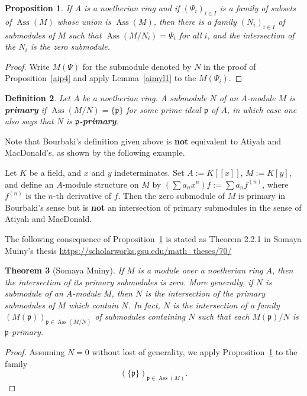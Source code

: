 \documentclass[12pt,letterpaper]{article}%
\newcommand{\oo}{\operatorname}\newcommand{\ooo}{\operatorname*}
\newcommand{\mf}{\mathfrak}
\newcommand{\ppp}{\mf p}
\newcommand{\Ass}{\oo{Ass}}
\newtheorem{thm}{Theorem}%
\newtheorem{df}[thm]{Definition}
\newtheorem{prop}[thm]{Proposition}
\begin{document}
\begin{prop}\label{aimyl2}
If $A$ is a noetherian ring and if $(\Psi_i)_{i\in I}$ is a family of subsets of $\Ass(M)$ whose union is $\Ass(M)$, then there is a family $(N_i)_{i\in I}$ of submodules of $M$ such that $\Ass(M/N_i)=\Psi_i$ for all $i$, and the intersection of the $N_i$ is the zero submodule.
\end{prop}
\begin{proof}
Write $M(\Psi)$ for the submodule denoted by $N$ in the proof of Proposition~\ref{aip4} and apply Lemma~\ref{aimyl1} to the $M(\Psi_i)$.
\end{proof}

\begin{df}
Let $A$ be a noetherian ring. A submodule $N$ of an $A$-module $M$ is \textbf{primary} if $\Ass(M/N)=\{\ppp\}$ for some prime ideal $\ppp$ of $A$, in which case one also says that $N$ is $\ppp$\textbf{-primary}. 
\end{df}

Note that Bourbaki's definition given above is \textbf{not} equivalent to Atiyah and MacDonald's, as shown by the following example.

Let $K$ be a field, and $x$ and $y$ indeterminates. Set $A:=K[[x]]$, $M:=K[y]$, and define an $A$-module structure on $M$ by $(\sum a_nx^n)f:=\sum a_nf^{(n)}$, where $f^{(n)}$ is the $n$-th derivative of $f$. Then the zero submodule of $M$ is primary in Bourbaki's sense but is \textbf{not} an intersection of primary submodules in the sense of Atiyah and MacDonald.

The following consequence of Proposition~\ref{aimyl2} is stated as Theorem 2.2.1 in Somaya Muiny's thesis \href{https://scholarworks.gsu.edu/math_theses/70/}{https://scholarworks.gsu.edu/math\_theses/70/}

\begin{thm}[Somaya Muiny]\label{somaya}
If $M$ is a module over a noetherian ring $A$, then the intersection of its primary submodules is zero. More generally, if $N$ is submodule of an $A$-module $M$, then $N$ is the intersection of the primary submodules of $M$ which contain $N$. In fact, $N$ is the intersection of a family $(M(\ppp))_{\ppp\in\Ass(M/N)}$ of submodules containing $N$ such that each $M(\ppp)/N$ is $\ppp$-primary.
\end{thm}
\begin{proof}
Assuming $N=0$ without lost of generality, we apply Proposition~\ref{aimyl2} to the family $$(\{\ppp\})_{\ppp\in\Ass(M)}.$$ 
\end{proof}
\end{document}
